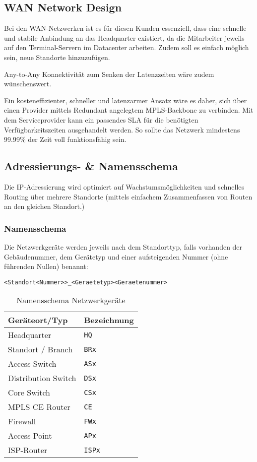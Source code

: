 \subsection{WAN Network Design}

Bei den WAN-Netzwerken ist es für diesen Kunden essenziell, dass eine schnelle und stabile Anbindung an das Headquarter existiert, da die Mitarbeiter jeweils auf den Terminal-Servern im Datacenter arbeiten. Zudem soll es einfach möglich sein, neue Standorte hinzuzufügen.

Any-to-Any Konnektivität zum Senken der Latenzzeiten wäre zudem wünschenswert.

Ein kosteneffizienter, schneller und latenzarmer Ansatz wäre es daher, sich über einen Provider mittels Redundant angelegtem MPLS-Backbone zu verbinden. Mit dem Serviceprovider kann ein passendes SLA für die benötigten Verfügbarkeitszeiten ausgehandelt werden. So sollte das Netzwerk mindestens 99.99\% der Zeit voll funktionsfähig sein.

\subsection{Adressierungs- \& Namensschema}

Die IP-Adressierung wird optimiert auf Wachstumsmöglichkeiten und schnelles Routing über mehrere Standorte (mittels einfachem Zusammenfassen von Routen an den gleichen Standort.)

\subsubsection{Namensschema}

Die Netzwerkgeräte werden jeweils nach dem Standorttyp, falls vorhanden der Gebäudenummer, dem Gerätetyp und einer aufsteigenden Nummer (ohne führenden Nullen) benannt:

\lstinline|<Standort<Nummer>>_<Geraetetyp><Geraetenummer>|

\begin{table}[h]
	\centering
	\begin{tabu}{l l}
		\toprule
		Geräteort/Typ & Bezeichnung \\
		\midrule
		Headquarter & \lstinline|HQ|\\
		Standort / Branch & \lstinline|BRx| \\
		\midrule
		Access Switch & \lstinline|ASx|\\
		Distribution Switch & \lstinline|DSx|\\
		Core Switch & \lstinline|CSx|\\
		MPLS CE Router & \lstinline|CE|\\
		Firewall & \lstinline|FWx| \\
		Access Point & \lstinline|APx| \\
		ISP-Router & \lstinline|ISPx| \\
		\bottomrule
	\end{tabu}
	\label{tbl:nameing_scheme}
	\caption{Namensschema Netzwerkgeräte}
\end{table}

